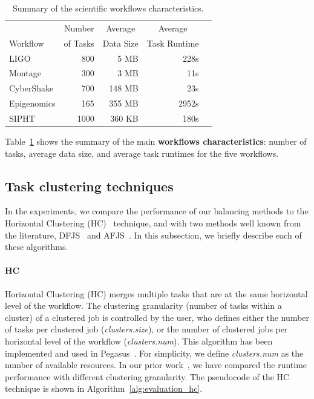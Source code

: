 \begin{table}[!htb]
	\setlength{\tabcolsep}{11pt}
	\centering
	\small
	\begin{tabular}{lrrrr}
		\hline
		 & \multicolumn{1}{c}{Number} & \multicolumn{1}{c}{Average} &  \multicolumn{1}{c}{Average} \\
		Workflow	& of Tasks	 & Data Size & Task Runtime \\
		\hline
		LIGO 		&800		& 5 MB	& 228s\\
		Montage 		&300		&3 MB	&11s\\
		CyberShake 	&700		&148 MB 	& 23s\\
		Epigenomics 	&165 	& 355 MB	& 2952s\\
		SIPHT		&1000	& 360 KB 	& 180s\\
		\hline
	\end{tabular}
	\caption{Summary of the scientific workflows characteristics.}
	\label{tab:evaluation_workflows}
\end{table} 

Table~\ref{tab:evaluation_workflows} shows the summary of the main \textbf{workflows characteristics}: number of tasks, average data size, and average task runtimes for the five workflows. 


\subsection{Task clustering techniques}

In the experiments, we compare the performance of our balancing methods to the Horizontal Clustering (HC)~\cite{Singh2008} technique, and with two methods well known from the literature, DFJS~\cite{Muthuvelu2005} and AFJS~\cite{Liu2009}. In this subsection, we briefly describe each of these algorithms.


\paragraph{\textbf{HC}}
Horizontal Clustering (HC) merges multiple tasks that are at the same horizontal level of the workflow. The clustering granularity (number of tasks within a cluster) of a clustered job is controlled by the user, who defines either the number of tasks per clustered job (\emph{clusters.size}), or the number of clustered jobs per horizontal level of the workflow (\emph{clusters.num}). This algorithm has been implemented and used in Pegasus~\cite{Singh2008}. For simplicity, we define \emph{clusters.num} as the number of available resources. In our prior work~\cite{6683907}, we have compared the runtime performance with different clustering granularity. The pseudocode of the HC technique is shown in Algorithm~\ref{alg:evaluation_hc}. 


